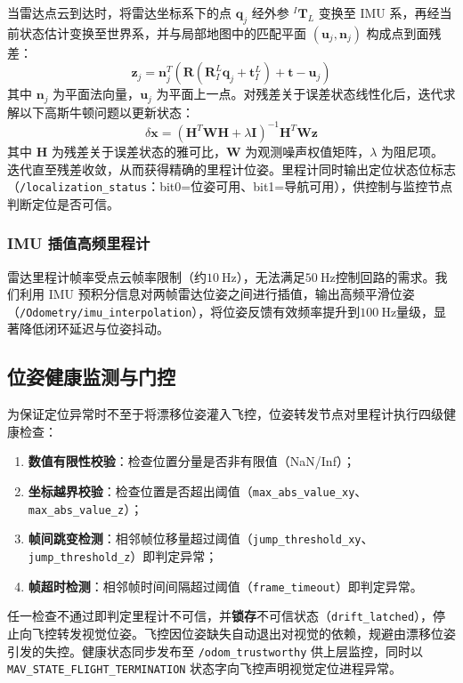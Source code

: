 当雷达点云到达时，将雷达坐标系下的点 $\boldsymbol{q}_j$ 经外参 ${}^{I}\boldsymbol{T}_{L}$ 变换至 IMU 系，再经当前状态估计变换至世界系，并与局部地图中的匹配平面 $(\boldsymbol{u}_j, \boldsymbol{n}_j)$ 构成点到面残差：
\begin{equation}
    \boldsymbol{z}_j = \boldsymbol{n}_j^T\left(
        \boldsymbol{R}\left( \boldsymbol{R}_{I}^{L} \boldsymbol{q}_j + \boldsymbol{t}_{I}^{L} \right) 
        + \boldsymbol{t} - \boldsymbol{u}_j
    \right)
\end{equation}
其中 $\boldsymbol{n}_j$ 为平面法向量，$\boldsymbol{u}_j$ 为平面上一点。对残差关于误差状态线性化后，迭代求解以下高斯牛顿问题以更新状态：
\begin{equation}
    \delta \boldsymbol{x} = \left( \boldsymbol{H}^T \boldsymbol{W} \boldsymbol{H} + \lambda \boldsymbol{I} \right)^{-1}
        \boldsymbol{H}^T \boldsymbol{W} \boldsymbol{z}
\end{equation}
其中 $\boldsymbol{H}$ 为残差关于误差状态的雅可比，$\boldsymbol{W}$ 为观测噪声权值矩阵，$\lambda$ 为阻尼项。迭代直至残差收敛，从而获得精确的里程计位姿。里程计同时输出定位状态位标志（\lstinline{/localization_status}：bit0=位姿可用、bit1=导航可用），供控制与监控节点判断定位是否可信。

\subsubsection{IMU 插值高频里程计}
雷达里程计帧率受点云帧率限制（约$\qty{10}{\Hz}$），无法满足$\qty{50}{\Hz}$控制回路的需求。我们利用 IMU 预积分信息对两帧雷达位姿之间进行插值，输出高频平滑位姿（\lstinline{/Odometry/imu_interpolation}），将位姿反馈有效频率提升到$\qty{100}{\Hz}$量级，显著降低闭环延迟与位姿抖动。

\subsection{位姿健康监测与门控}
为保证定位异常时不至于将漂移位姿灌入飞控，位姿转发节点对里程计执行四级健康检查：
\begin{enumerate}
    \item \textbf{数值有限性校验}：检查位置分量是否非有限值（NaN/Inf）；
    \item \textbf{坐标越界校验}：检查位置是否超出阈值（\lstinline{max_abs_value_xy}、\lstinline{max_abs_value_z}）；
    \item \textbf{帧间跳变检测}：相邻帧位移量超过阈值（\lstinline{jump_threshold_xy}、\lstinline{jump_threshold_z}）即判定异常；
    \item \textbf{帧超时检测}：相邻帧时间间隔超过阈值（\lstinline{frame_timeout}）即判定异常。
\end{enumerate}
任一检查不通过即判定里程计不可信，并\textbf{锁存}不可信状态（\lstinline{drift_latched}），停止向飞控转发视觉位姿。飞控因位姿缺失自动退出对视觉的依赖，规避由漂移位姿引发的失控。健康状态同步发布至 \lstinline{/odom_trustworthy} 供上层监控，同时以 \lstinline{MAV_STATE_FLIGHT_TERMINATION} 状态字向飞控声明视觉定位进程异常。


